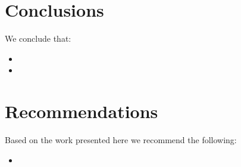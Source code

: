 
\section[Conclusions]{Conclusions} \label{sec:conclusions}

We conclude that:
\begin{itemize}
    \item %
    \item
\end{itemize}

\section[Recommendations]{Recommendations} \label{sec:recommendations}

Based on the work presented here we recommend the following:
\begin{itemize}
    \item %
\end{itemize}